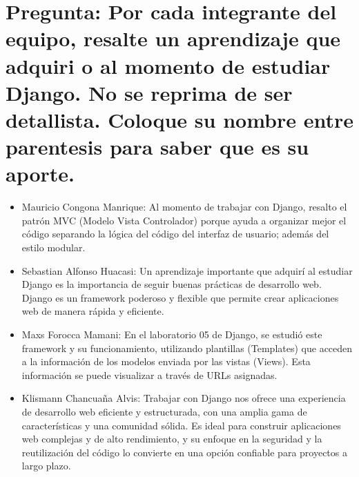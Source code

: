 \section{Pregunta: Por cada integrante del equipo, resalte un aprendizaje que adquiri o al momento de estudiar
Django. No se reprima de ser detallista. Coloque su nombre entre parentesis para saber que es
su aporte.}
\begin{itemize}
	\item Mauricio Congona Manrique: Al momento de trabajar con Django, resalto el patrón MVC (Modelo Vista Controlador) porque ayuda a organizar mejor el código separando la lógica del código del interfaz de usuario; además del estilo modular.
        \item Sebastian Alfonso Huacasi: Un aprendizaje importante que adquirí al estudiar Django es la importancia de seguir buenas prácticas de desarrollo web. Django es un framework poderoso y flexible que permite crear aplicaciones web de manera rápida y eficiente.
        \item Maxs Forocca Mamani: En el laboratorio 05 de Django, se estudió este framework y su funcionamiento, utilizando plantillas (Templates) que acceden a la información de los modelos enviada por las vistas (Views). Esta información se puede visualizar a través de URLs asignadas.
        \item Klismann Chancuaña Alvis: Trabajar con Django nos ofrece una experiencia de desarrollo web eficiente y estructurada, con una amplia gama de características y una comunidad sólida. Es ideal para construir aplicaciones web complejas y de alto rendimiento, y su enfoque en la seguridad y la reutilización del código lo convierte en una opción confiable para proyectos a largo plazo.
\end{itemize}
